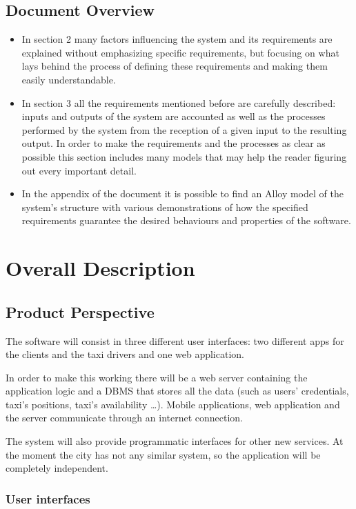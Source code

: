 \documentclass[a4paper]{article}
\begin{document}
\subsection{Document Overview}
\begin{itemize}
\item In section 2 many factors influencing the system and its requirements are explained without emphasizing specific requirements, but focusing on what lays behind the process of defining these requirements and making them easily understandable.
\item In section 3 all the requirements mentioned before are carefully described: inputs and outputs of the system are accounted as well as the processes performed by the system from the reception of a given input to the resulting output. In order to make the requirements and the processes as clear as possible this section includes many models that may help the reader figuring out every important detail.
\item In the appendix of the document it is possible to find an Alloy model of the system's structure with various demonstrations of how the specified requirements guarantee the desired behaviours and properties of the software.

\end{itemize}
\section{Overall Description}
\subsection{Product Perspective}
The software will consist in three different user interfaces: two different apps for the clients and the taxi drivers and one web application. 

In order to make this working there will be a web server containing the application logic and a DBMS that stores all the data (such as users' credentials, taxi's positions, taxi's availability \ldots).
Mobile applications, web application and the server communicate through an internet connection.

The system will also provide programmatic interfaces for other new services. At the moment the city has not any similar system, so the application will be completely independent.
\subsubsection{User interfaces}
\end{document}
